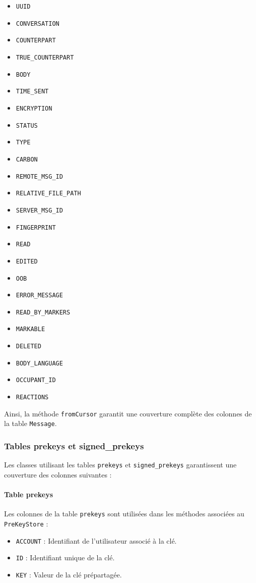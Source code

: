 \documentclass[a4paper,11pt]{article}
\begin{document}
\begin{itemize}
    \item \texttt{UUID}
    \item \texttt{CONVERSATION}
    \item \texttt{COUNTERPART}
    \item \texttt{TRUE\_COUNTERPART}
    \item \texttt{BODY}
    \item \texttt{TIME\_SENT}
    \item \texttt{ENCRYPTION}
    \item \texttt{STATUS}
    \item \texttt{TYPE}
    \item \texttt{CARBON}
    \item \texttt{REMOTE\_MSG\_ID}
    \item \texttt{RELATIVE\_FILE\_PATH}
    \item \texttt{SERVER\_MSG\_ID}
    \item \texttt{FINGERPRINT}
    \item \texttt{READ}
    \item \texttt{EDITED}
    \item \texttt{OOB}
    \item \texttt{ERROR\_MESSAGE}
    \item \texttt{READ\_BY\_MARKERS}
    \item \texttt{MARKABLE}
    \item \texttt{DELETED}
    \item \texttt{BODY\_LANGUAGE}
    \item \texttt{OCCUPANT\_ID}
    \item \texttt{REACTIONS}
\end{itemize}

Ainsi, la méthode \texttt{fromCursor} garantit une couverture complète des colonnes de la table \texttt{Message}.

\subsubsection*{Tables prekeys et signed\_prekeys}

Les classes utilisant les tables \texttt{prekeys} et \texttt{signed\_prekeys} garantissent une couverture des colonnes suivantes :

\paragraph{Table prekeys}
Les colonnes de la table \texttt{prekeys} sont utilisées dans les méthodes associées au \texttt{PreKeyStore} :
\begin{itemize}
    \item \texttt{ACCOUNT} : Identifiant de l'utilisateur associé à la clé.
    \item \texttt{ID} : Identifiant unique de la clé.
    \item \texttt{KEY} : Valeur de la clé prépartagée.
\end{itemize}
\end{document}
